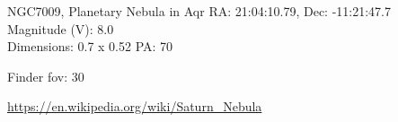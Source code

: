 \begin{block}{NGC7009, Planetary Nebula in Aqr}
    RA: 21:04:10.79, Dec: -11:21:47.7 \\ 
    Magnitude (V): 8.0 \\ 
    Dimensions: 0.7 x 0.52 PA: 70 

    Finder fov: 30 

    \url{https://en.wikipedia.org/wiki/Saturn_Nebula} 
\end{block}